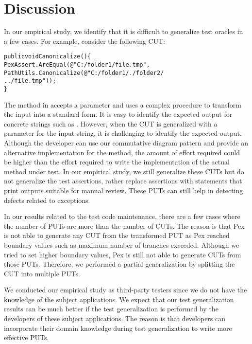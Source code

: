 \section{Discussion} 
\label{sec:limitations}

In our empirical study, we identify that it is difficult to generalize test oracles in a few cases. For example, consider the following CUT:\vspace*{-1ex}

\begin{CodeOut}
\begin{alltt}
public void Canonicalize() \{
\hspace*{0.1in}PexAssert.AreEqual(@"C:/folder1/file.tmp",
\hspace*{0.3in}PathUtils.Canonicalize(@"C:/folder1/./folder2/
\hspace*{0.3in}../file.tmp")); 
\}
\end{alltt}
\end{CodeOut}

The  method in  accepts a  parameter and uses a complex procedure to transform the input into a standard form. It is easy to identify the expected output for concrete strings such as . However, when the CUT is generalized with a parameter for the input string, it is challenging to identify the expected output. Although the developer can use our commutative diagram pattern and provide an alternative implementation for the  method, the amount of effort required could be higher than the effort required to write the implementation of the actual method under test. In our empirical study, we still generalize these CUTs but do not generalize the test assertions, rather replace assertions with statements that print outputs suitable for manual review. These PUTs can still help in detecting defects related to exceptions.

In our results related to the test code maintenance, there are a few cases where the number of PUTs are more than the number of CUTs. The reason is that Pex is not able to generate any CUT from the transformed PUT as Pex reached boundary values such as maximum number of branches exceeded. Although we tried to set higher boundary values, Pex is still not able to generate CUTs from those PUTs. Therefore, we performed a partial generalization by splitting the CUT into multiple PUTs.

We conducted our empirical study as third-party testers since we do not have the knowledge of the subject applications. We expect that our test generalization results can be much better if the test generalization is performed by the developers of these subject applications. The reason is that developers can incorporate their domain knowledge during test generalization to write more effective PUTs.


